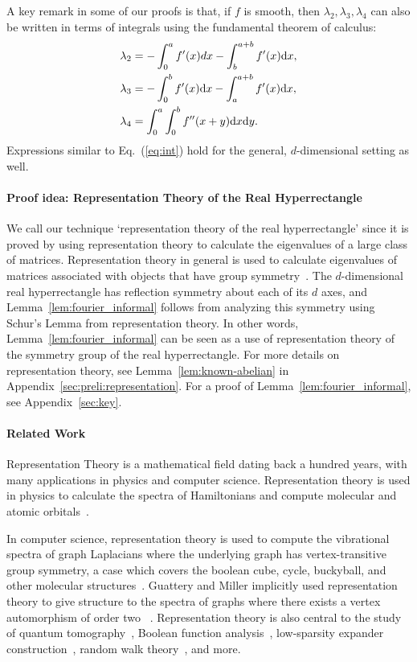 A key remark in some of our proofs is that, if $f$ is smooth, then $\lambda_2, \lambda_3, \lambda_4$ can also be written in terms of integrals using the fundamental theorem of calculus:
\begin{align}\label{eq:int}
\nonumber & \lambda_2 = -\int_0^a f'(x) dx - \int_b^{a+b} f'(x) \mathrm{d} x, \\
 & \lambda_3 = -\int_0^b f'(x) \mathrm{d} x - \int_a^{a+b} f'(x) \mathrm{d} x, \\
\nonumber & \lambda_4 = \int_0^a \int_0^b f''(x+y) \mathrm{d} x \mathrm{d} y. 
\end{align}
Expressions similar to Eq.~(\ref{eq:int}) hold for the general, $d$-dimensional setting as well.

\paragraph{Proof idea: Representation Theory of the Real Hyperrectangle} We call our technique `representation theory of the real hyperrectangle' since it is proved by using representation theory to calculate the eigenvalues of a large class of matrices. Representation theory in general is used to calculate eigenvalues of matrices associated with objects that have group symmetry~\cite{fh91, etingof}. The $d$-dimensional real hyperrectangle has reflection symmetry about each of its $d$ axes, and Lemma~\ref{lem:fourier_informal} follows from analyzing this symmetry using Schur's Lemma from representation theory. In other words, Lemma~\ref{lem:fourier_informal} can be seen as a use of representation theory of the symmetry group of the real hyperrectangle. For more details on representation theory, see Lemma~\ref{lem:known-abelian} in Appendix~\ref{sec:preli:representation}. For a proof of Lemma~\ref{lem:fourier_informal}, see Appendix~\ref{sec:key}.

\paragraph{Related Work}
Representation Theory is a mathematical field dating back a hundred years, with many applications in physics and computer science. Representation theory is used in physics to calculate the spectra of Hamiltonians and compute molecular and atomic orbitals~\cite{feynman}. 

In computer science, representation theory is used to compute the vibrational spectra of graph Laplacians where the underlying graph has vertex-transitive group symmetry, a case which covers the boolean cube, cycle, buckyball, and other molecular structures~\cite{GS92, ODonnell14, spielman-notes}. Guattery and Miller implicitly used representation theory to give structure to the spectra of graphs where there exists a vertex automorphism of order two ~\cite{GM98}.  Representation theory is also central to the study of quantum tomography~\cite{OW16}, Boolean function analysis~\cite{ODonnell14}, low-sparsity expander construction~\cite{M88, LPS88}, random walk theory~\cite{Diaconis02, Saloff04, FOW18}, and more. %

